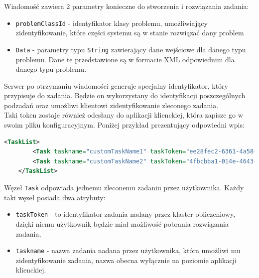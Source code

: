 \documentclass[12pt,a4paper,titlepage]{report}
\begin{document}
     Wiadomość zawiera 2 parametry konieczne do stworzenia i rozwiązania zadania:
    \begin{itemize}
    	\item \verb+problemClassId+ - identyfikator klasy problemu, umożliwiający zidentyfikowanie, które części systemu są w stanie rozwiązać dany problem
    	\item \verb+Data+ - parametry typu \verb+String+ zawierający dane wejściowe dla danego typu problemu. Dane te przedstawione są w formacie XML odpowiednim dla danego typu problemu.  
    \end{itemize}
    
    Serwer po otrzymaniu wiadomości generuje specjalny identyfikator, który przypisuje do zadania. Będzie on wykorzystany do 
    identyfikacji poszczególnych podzadań oraz umożliwi klientowi zidentyfikowanie zleconego zadania.\\
    
    
    
    Taki token zostaje również odesłany do aplikacji klienckiej, która zapisze go w swoim pliku konfiguracyjnym. Poniżej przykład prezentujący odpowiedni wpis:
    
    \begin{lstlisting}[language=XML,numbers=none]
    <TaskList>
    	<Task taskname="customTaskName1" taskToken="ee28fec2-6361-4a58-aaf1-b9ff0f509743"/>
    	<Task taskname="customTaskName2" taskToken="4fbcbba1-014e-4643-b60f-f7888a95bb54"/>
    </TaskList>
    \end{lstlisting}
    Węzeł \verb+Task+ odpowiada jednemu zleconemu zadaniu przez użytkownika. Każdy taki węzeł posiada dwa atrybuty:
	
	\begin{itemize}
		\item \verb+taskToken+ - to identyfikator zadania nadany przez klaster obliczeniowy, dzięki niemu użytkownik będzie miał możliwość pobrania rozwiązania zadania,
		\item \verb+taskname+ - nazwa zadania nadana przez użytkownika, która umożliwi mu zidentyfikowanie zadania, nazwa obecna wyłącznie na poziomie aplikacji klienckiej.
	\end{itemize}	    
      
\end{document}
